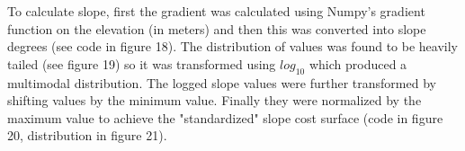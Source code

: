 \documentclass[article,12pt]{article}
\numberwithin{equation}{section}
\begin{document}
To calculate slope, first the gradient was calculated using Numpy's gradient function on the elevation (in meters) and then this was converted into slope degrees (see code in figure 18). The distribution of values was found to be heavily tailed (see figure 19) so it was transformed using $log_{10}$ which produced a multimodal distribution. The logged slope values were further transformed by shifting values by the minimum value. Finally they were normalized by the maximum value to achieve the "standardized" slope cost surface (code in figure 20, distribution in figure 21). \enlargethispage{\baselineskip}
\begin{adjustwidth}{-.8in}{-.8in}
	\begin{multicols}{2}
		\\
		\\
		\\
		\\
	\end{multicols}
\end{adjustwidth}
\end{document}
